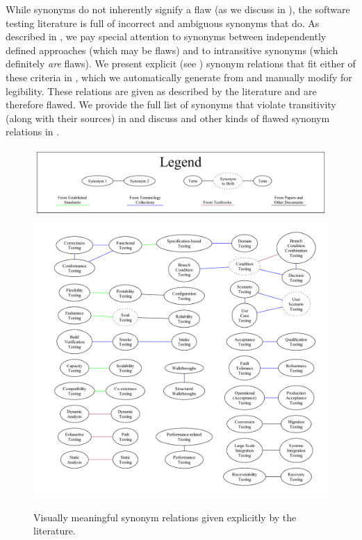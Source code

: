 While synonyms do not inherently signify a flaw (as we discuss in
), the software testing literature is full of incorrect and
ambiguous synonyms that do. As described in , we pay
special attention to synonyms between independently defined approaches (which
may be flaws) and to intransitive synonyms (which definitely \emph{are} flaws).
\ifnotpaper We present explicit (see ) synonym relations that
    fit either of these criteria in \utd{}, which we
    automatically generate from \ourApproachGlossary{} and manually modify for
    legibility. These relations are given as described by the literature and are
    therefore flawed. We provide the full list of synonyms that violate
    transitivity (along with their sources) in  and discuss and
    other kinds of flawed synonym relations in .
    \begin{figure}[bt!]
        \centering
        \includegraphics[width=\linewidth]{assets/graphs/manual/expSynLegend.pdf}
        \includegraphics[width=\linewidth]{assets/graphs/manual/expSynGraph.pdf}
        \caption{Visually meaningful synonym relations
            given explicitly by the literature.}\label{fig:expSynGraph}
    \end{figure}
    \clearpage
\fi

